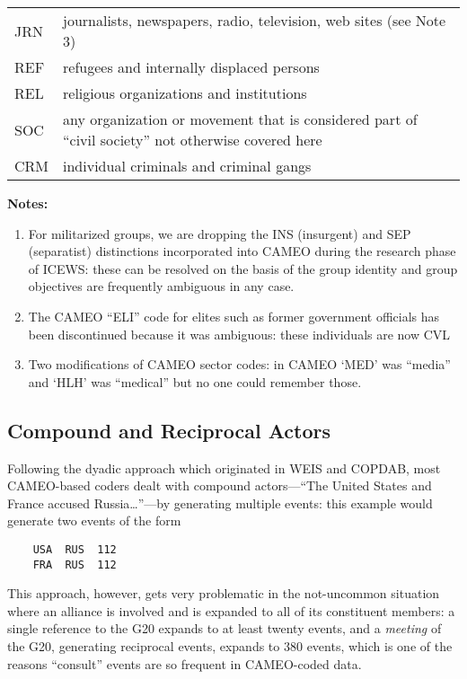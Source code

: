 \documentclass[11pt]{report}
\begin{document}
\begin{center}
\begin{longtable}{|l|p{13cm}|}
	  JRN & journalists, newspapers, radio, television, web sites (see Note 3)  \\ 
	  REF & refugees and internally displaced persons \\
	  REL & religious organizations and institutions \\ 
	  SOC & any organization or movement that is considered part of ``civil society''  not otherwise covered here\\
	  CRM & individual criminals and criminal gangs \\
  \hline
\end{longtable}
\noindent \raggedright{\textbf{Notes:}}
\begin{enumerate}
\item For militarized groups, we are dropping the INS (insurgent) and SEP (separatist) distinctions incorporated into CAMEO during the research phase of ICEWS: these can be resolved on the basis of the group identity and group objectives are frequently ambiguous in any case. 
\item The CAMEO ``ELI'' code for elites such as former government officials has been discontinued because it was ambiguous: these individuals are now CVL
\item Two modifications of CAMEO sector codes: in CAMEO `MED' was ``media'' and `HLH' was ``medical'' but no one could remember those.
\end{enumerate}
\end{center}

\newpage

\subsection{Compound and Reciprocal Actors}\label{sec:recip}

Following the dyadic approach which originated in WEIS and COPDAB,  most CAMEO-based coders dealt with compound actors---``The United States and France accused Russia\ldots''---by generating multiple events: this example would generate two events of the form
\begin{verbatim}
	USA  RUS  112
	FRA  RUS  112
\end{verbatim}
This approach, however, gets very problematic in the not-uncommon situation where an alliance is involved and is expanded to all of its constituent members: a single reference to the G20 expands to at least twenty events, and a \textit{meeting} of the G20, generating reciprocal events, expands to 380 events, which is one of the reasons ``consult'' events are so frequent in CAMEO-coded data.
\end{document}
